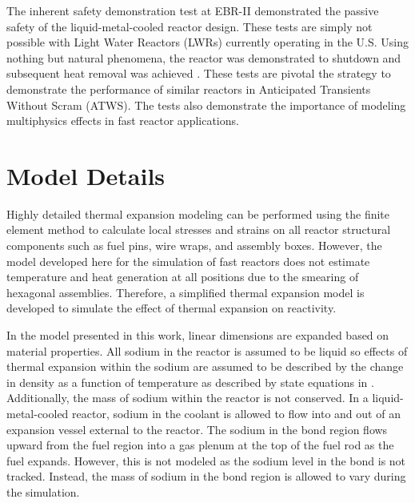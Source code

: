   The inherent safety demonstration test at EBR-II demonstrated the passive
  safety of the liquid-metal-cooled reactor design. These tests are simply not 
  possible with Light Water Reactors (LWRs) currently operating in the U.S. 
  Using nothing but natural phenomena, the reactor was demonstrated to shutdown 
  and subsequent heat removal was achieved \cite{ebriitests}. These tests are 
  pivotal the strategy to demonstrate the performance of similar reactors in 
  Anticipated Transients Without Scram (ATWS). The tests also demonstrate the 
  importance of modeling multiphysics effects in fast reactor applications.

\section{Model Details}
  \label{sec:model_details}
  Highly detailed thermal expansion modeling can be performed using the finite
  element method to calculate local stresses and strains on all reactor
  structural components such as fuel pins, wire wraps, and assembly boxes. 
  However, the model developed here for the simulation of
  fast reactors does not estimate temperature and heat generation at all 
  positions due to the smearing of hexagonal assemblies. Therefore, a simplified 
  thermal expansion model is developed to simulate the effect of thermal 
  expansion on reactivity.

  In the model presented in this work, linear dimensions are expanded based on 
  material properties.  All sodium in the reactor is assumed to be liquid so 
  effects of thermal expansion within the sodium are assumed to be described by 
  the change in density as a function of temperature as described by state 
  equations in \cite{sodiumProp}. Additionally, the mass of sodium within the 
  reactor is not conserved. In a liquid-metal-cooled reactor, sodium in the 
  coolant is allowed to flow into and out of an expansion vessel external to the 
  reactor.  The sodium in the bond region flows upward from the fuel region into 
  a gas plenum at the top of the fuel rod as the fuel expands. However, this is 
  not modeled as the sodium level in the bond is not tracked. Instead, the mass 
  of sodium in the bond region is allowed to vary during the simulation.

